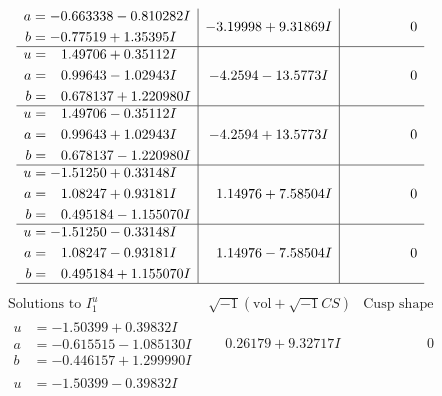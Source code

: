 \documentclass[1p]{elsarticle_modified}
\theoremstyle{definition}
\newcommand{\I}{\sqrt{-1}}
\begin{document}
$$\begin{array}{c|c|c}
\begin{aligned}
a &= -0.663338 - 0.810282 I \\
b &= -0.77519 + 1.35395 I\end{aligned}
 & -3.19998 + 9.31869 I & \phantom{-0.000000 } 0 \\ \hline\begin{aligned}
u &= \phantom{-}1.49706 + 0.35112 I \\
a &= \phantom{-}0.99643 - 1.02943 I \\
b &= \phantom{-}0.678137 + 1.220980 I\end{aligned}
 & -4.2594 - 13.5773 I & \phantom{-0.000000 } 0 \\ \hline\begin{aligned}
u &= \phantom{-}1.49706 - 0.35112 I \\
a &= \phantom{-}0.99643 + 1.02943 I \\
b &= \phantom{-}0.678137 - 1.220980 I\end{aligned}
 & -4.2594 + 13.5773 I & \phantom{-0.000000 } 0 \\ \hline\begin{aligned}
u &= -1.51250 + 0.33148 I \\
a &= \phantom{-}1.08247 + 0.93181 I \\
b &= \phantom{-}0.495184 - 1.155070 I\end{aligned}
 & \phantom{-}1.14976 + 7.58504 I & \phantom{-0.000000 } 0 \\ \hline\begin{aligned}
u &= -1.51250 - 0.33148 I \\
a &= \phantom{-}1.08247 - 0.93181 I \\
b &= \phantom{-}0.495184 + 1.155070 I\end{aligned}
 & \phantom{-}1.14976 - 7.58504 I & \phantom{-0.000000 } 0\\
 \hline 
 \end{array}$$\newpage$$\begin{array}{c|c|c}  
\text{Solutions to }I^u_{1}& \I (\text{vol} + \sqrt{-1}CS) & \text{Cusp shape}\\
 \hline 
\begin{aligned}
u &= -1.50399 + 0.39832 I \\
a &= -0.615515 - 1.085130 I \\
b &= -0.446157 + 1.299990 I\end{aligned}
 & \phantom{-}0.26179 + 9.32717 I & \phantom{-0.000000 } 0 \\ \hline\begin{aligned}
u &= -1.50399 - 0.39832 I \\

\end{aligned}
\end{array}$$
\end{document}
